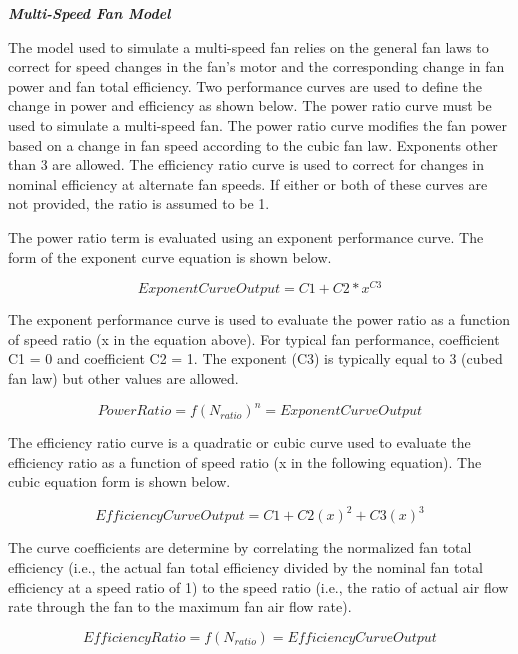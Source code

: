 \emph{\textbf{Multi-Speed Fan Model}}

The model used to simulate a multi-speed fan relies on the general fan laws to correct for speed changes in the fan's motor and the corresponding change in fan power and fan total efficiency. Two performance curves are used to define the change in power and efficiency as shown below. The power ratio curve must be used to simulate a multi-speed fan. The power ratio curve modifies the fan power based on a change in fan speed according to the cubic fan law. Exponents other than 3 are allowed. The efficiency ratio curve is used to correct for changes in nominal efficiency at alternate fan speeds. If either or both of these curves are not provided, the ratio is assumed to be 1.

The power ratio term is evaluated using an exponent performance curve. The form of the exponent curve equation is shown below.

\begin{equation}
ExponentCurveOutput = C1 + C2*{x^{C3}}
\end{equation}

The exponent performance curve is used to evaluate the power ratio as a function of speed ratio (x in the equation above). For typical fan performance, coefficient C1 = 0 and coefficient C2 = 1. The exponent (C3) is typically equal to 3 (cubed fan law) but other values are allowed.

\begin{equation}
PowerRatio = f{\left( {{N_{ratio}}} \right)^n} = ExponentCurveOutput
\end{equation}

The efficiency ratio curve is a quadratic or cubic curve used to evaluate the efficiency ratio as a function of speed ratio (x in the following equation). The cubic equation form is shown below.

\begin{equation}
EfficiencyCurveOutput = C1 + C2{\left( x \right)^2} + C3{\left( x \right)^3}
\end{equation}

The curve coefficients are determine by correlating the normalized fan total efficiency (i.e., the actual fan total efficiency divided by the nominal fan total efficiency at a speed ratio of 1) to the speed ratio (i.e., the ratio of actual air flow rate through the fan to the maximum fan air flow rate).

\begin{equation}
EfficiencyRatio = f\left( {{N_{ratio}}} \right) = EfficiencyCurveOutput
\end{equation}

